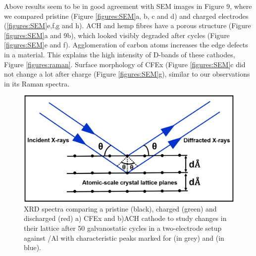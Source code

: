 Above results seem to be in good agreement with SEM images in Figure 9, where we compared pristine (Figure \ref{figures:SEM}a, b, c and d) and charged electrodes (\ref{figures:SEM}e,f,g and h). ACH and hemp fibres have a porous structure (Figure \ref{figures:SEM}a and 9b), which looked visibly degraded after cycles (Figure \ref{figures:SEM}e and f). Agglomeration of carbon atoms increases the edge defects in a material. This explains the high intensity of D-bands of these cathodes, Figure \ref{figures:raman}. Surface morphology of CFEx (Figure \ref{figures:SEM}c did not change a lot after charge (Figure \ref{figures:SEM}g), similar to our observations in its Raman spectra. 
\begin{figure}[tbh!]
  \centering
  \includegraphics[width=\textwidth]{figures/XRD}
    \caption{XRD spectra comparing a pristine (black), charged (green) and discharged (red) a) CFEx and b)ACH cathode to study changes in their lattice after 50 galvanostatic cycles in a two-electrode setup against /Al with characteristic peaks marked for  (in grey) and  (in blue).}
  \label{figures:XRD}
\end{figure}
